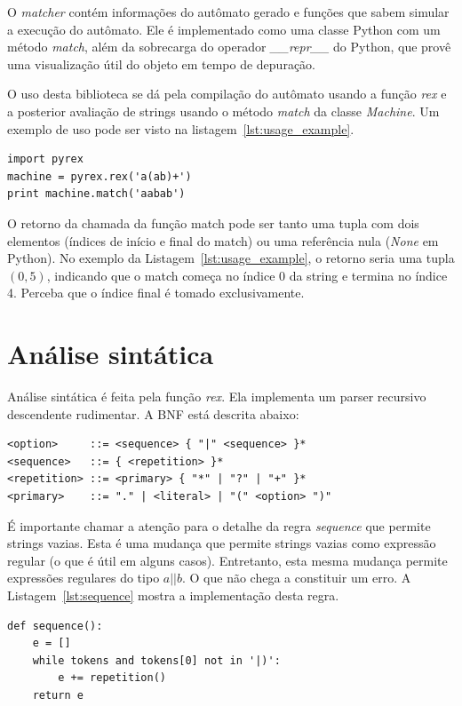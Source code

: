 \documentclass[a4paper,12pt,oneside,onecolumn]{uerj}
\begin{document}
O \emph{matcher} contém informações do autômato gerado e funções que sabem simular a execução do autômato. Ele é implementado como uma classe Python com um método \emph{match}, além da sobrecarga do operador \emph{\_\_repr\_\_} do Python, que provê uma visualização útil do objeto em tempo de depuração.

O uso desta biblioteca se dá pela compilação do autômato usando a função \emph{rex} e a posterior avaliação de strings usando o método \emph{match} da classe \emph{Machine}. Um exemplo de uso pode ser visto na listagem~\ref{lst:usage_example}.

\vspace{0.5cm}
\begin{lstlisting}[caption={Exemplo de uso da biblioteca PyRex},label=lst:usage_example]
import pyrex
machine = pyrex.rex('a(ab)+')
print machine.match('aabab')
\end{lstlisting}

O retorno da chamada da função match pode ser tanto uma tupla com dois elementos (índices de início e final do match) ou uma referência nula (\emph{None} em Python). No exemplo da Listagem~\ref{lst:usage_example}, o retorno seria uma tupla $(0, 5)$, indicando que o match começa no índice 0 da string e termina no índice 4. Perceba que o índice final é tomado exclusivamente.


\section{Análise sintática}

Análise sintática é feita pela função \emph{rex}. Ela implementa um parser recursivo descendente rudimentar. A BNF está descrita abaixo:

\begin{verbatim}
<option>     ::= <sequence> { "|" <sequence> }*
<sequence>   ::= { <repetition> }*
<repetition> ::= <primary> { "*" | "?" | "+" }*
<primary>    ::= "." | <literal> | "(" <option> ")"
\end{verbatim}

É importante chamar a atenção para o detalhe da regra \emph{sequence} que permite strings vazias. Esta é uma mudança que permite strings vazias como expressão regular (o que é útil em alguns casos). Entretanto, esta mesma mudança permite expressões regulares do tipo $a||b$. O que não chega a constituir um erro. A Listagem~\ref{lst:sequence} mostra a implementação desta regra.

\vspace{0.5cm}
\begin{lstlisting}[caption={Implementação da regra \emph{sequence}},label=lst:sequence]
def sequence():
    e = []
    while tokens and tokens[0] not in '|)':
        e += repetition()
    return e
\end{lstlisting}
\end{document}
